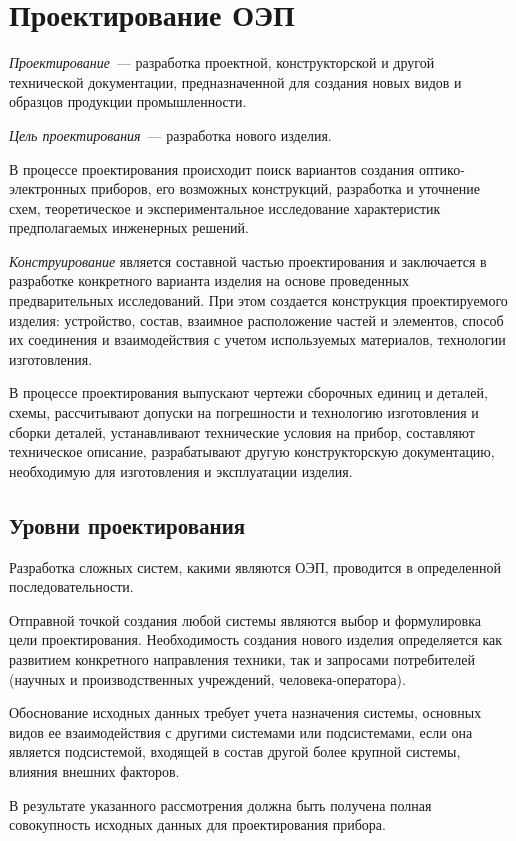\chapter{Проектирование ОЭП} 

\textit{Проектирование}~--- разработка проектной, конструкторской и другой технической документации, предназначенной для создания новых видов и образцов продукции промышленности.

\textit{Цель проектирования}~--- разработка нового изделия.

В процессе проектирования происходит поиск вариантов создания оптико-электронных приборов, его возможных конструкций, разработка и уточнение схем, теоретическое и экспериментальное исследование характеристик предполагаемых инженерных решений.

\textit{Конструирование} является составной частью проектирования и заключается в разработке конкретного варианта изделия на основе проведенных предварительных исследований. При этом создается конструкция проектируемого изделия: устройство, состав, взаимное расположение частей и элементов, способ их соединения и взаимодействия с учетом используемых материалов, технологии изготовления.

В процессе проектирования выпускают чертежи сборочных единиц и деталей, схемы, рассчитывают допуски на погрешности и технологию изготовления и сборки деталей, устанавливают технические условия на прибор, составляют техническое описание, разрабатывают другую конструкторскую документацию, необходимую для изготовления и эксплуатации изделия.

\section{Уровни проектирования}
Разработка сложных систем, какими являются ОЭП, проводится в определенной последовательности.

Отправной точкой создания любой системы являются выбор и формулировка цели проектирования. Необходимость создания нового изделия определяется как развитием конкретного направления техники, так и запросами потребителей (научных и производственных учреждений, человека-оператора). 

Обоснование исходных данных требует учета назначения системы, основных видов ее взаимодействия с другими системами или подсистемами, если она является подсистемой, входящей в состав другой более крупной системы, влияния внешних факторов.

В результате указанного рассмотрения должна быть получена полная совокупность исходных данных для проектирования прибора. 

